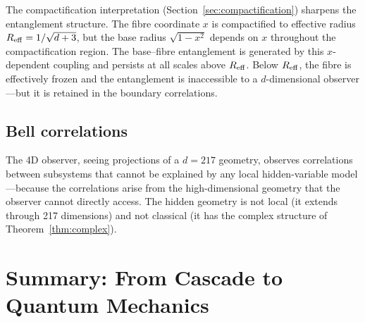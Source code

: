 \documentclass[12pt,a4paper]{article}
\begin{document}
The compactification interpretation (Section~\ref{sec:compactification}) sharpens the
entanglement structure. The fibre coordinate $x$ is compactified to effective radius
$R_{\rm eff}=1/\sqrt{d+3}$, but the base radius $\sqrt{1-x^2}$ depends on $x$ throughout
the compactification region. The base--fibre entanglement is generated by this $x$-dependent
coupling and persists at all scales above $R_{\rm eff}$. Below $R_{\rm eff}$, the fibre is
effectively frozen and the entanglement is inaccessible to a $d$-dimensional observer---but
it is retained in the boundary correlations.

\subsection{Bell correlations}

The 4D observer, seeing projections of a $d=217$ geometry, observes correlations between
subsystems that cannot be explained by any local hidden-variable model---because the
correlations arise from the high-dimensional geometry that the observer cannot directly
access. The hidden geometry is not local (it extends through 217 dimensions) and not
classical (it has the complex structure of Theorem~\ref{thm:complex}).

\section{Summary: From Cascade to Quantum Mechanics}
\end{document}
